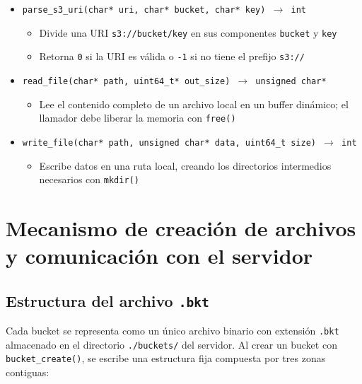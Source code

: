 \documentclass[12pt, letterpaper]{article}
\begin{document}
\begin{itemize}
{          char* local) $\to$ int}
        \begin{itemize}
            \item Envía \texttt{CMD\_GET} y escribe el contenido 
                  recibido en la ruta local con \texttt{write\_file()}
            \item Si \texttt{local} es un directorio, construye el 
                  nombre del archivo usando la parte final de la clave
        \end{itemize}
    \item \texttt{parse\_s3\_uri(char* uri, char* bucket, 
          char* key) $\to$ int}
        \begin{itemize}
            \item Divide una URI \texttt{s3://bucket/key} en sus 
                  componentes \texttt{bucket} y \texttt{key}
            \item Retorna \texttt{0} si la URI es válida o \texttt{-1} 
                  si no tiene el prefijo \texttt{s3://}
        \end{itemize}
    \item \texttt{read\_file(char* path, uint64\_t* out\_size) 
          $\to$ unsigned char*}
        \begin{itemize}
            \item Lee el contenido completo de un archivo local en un 
                  buffer dinámico; el llamador debe liberar la memoria 
                  con \texttt{free()}
        \end{itemize}
    \item \texttt{write\_file(char* path, unsigned char* data, 
          uint64\_t size) $\to$ int}
        \begin{itemize}
            \item Escribe datos en una ruta local, creando los 
                  directorios intermedios necesarios con \texttt{mkdir()}
        \end{itemize}
\end{itemize}

\section{Mecanismo de creación de archivos y comunicación con el servidor}

\subsection{Estructura del archivo \texttt{.bkt}}
Cada bucket se representa como un único archivo binario con extensión 
\texttt{.bkt} almacenado en el directorio \texttt{./buckets/} del servidor. 
Al crear un bucket con \texttt{bucket\_create()}, se escribe una estructura 
fija compuesta por tres zonas contiguas:
\end{document}
